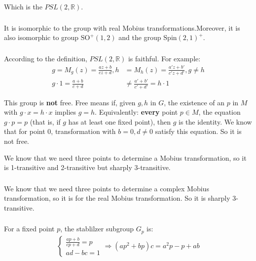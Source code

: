 \documentclass[]{ctexart}
\begin{document}
			Which is the $PSL(2,\mathbb{R})$.
		
		\subsubsection{}
			It is isomorphic to the group with real Mobius transformations.Moreover, it is also isomorphic to group $\text{SO}^+(1,2)$ and the group $\text{Spin}(2,1)^+$. 
		
		\subsubsection{}
			According to the definition, $PSL(2,\mathbb{R})$ is faithful. For example:
				\begin{equation*}
				\begin{aligned}
					g=M_g(z)=\frac{az+b}{cz+d}, h&=M_h(z)=\frac{a'z+b'}{c'z+d'},g\neq h\\
					g\cdot 1=\frac{a+b}{c+d}&\neq \frac{a'+b'}{c'+d'}=h\cdot 1
				\end{aligned}
				\end{equation*}
				
			This group is \textbf{not} free. Free means if, given $ g, h $ in $ G $, the existence of an $ p $ in $ M $ with $ g\cdot x = h\cdot x $ implies $ g = h $. Equivalently: \textbf{every} point $p\in M$, the equation $g\cdot p=p$ (that is, if $ g $ has at least one fixed point), then $ g $ is the identity. We know that for point $0$, transformation with $b=0,d\neq0$ satisfy this equation. So it is not free. 
			
			We know that we need three points to determine a Mobius transformation, so it is 1-transitive and 2-transitive but sharply 3-transitive. 
			
		\subsubsection{}
			We know that we need three points to determine a complex Mobius transformation, so it is for the real Mobius transformation. So it is sharply 3-transitive. 
			
		\subsubsection{}
			For a fixed point $p$, the stablilzer subgroup $G_p$ is:
				\begin{equation*}
				\begin{aligned}
					\begin{cases}
						\frac{ap+b}{cp+d}=p\\
						ad-bc=1
					\end{cases}
					\Rightarrow (ap^2+bp)c=a^2p-p+ab
				\end{aligned}
				\end{equation*}
			
\end{document}
